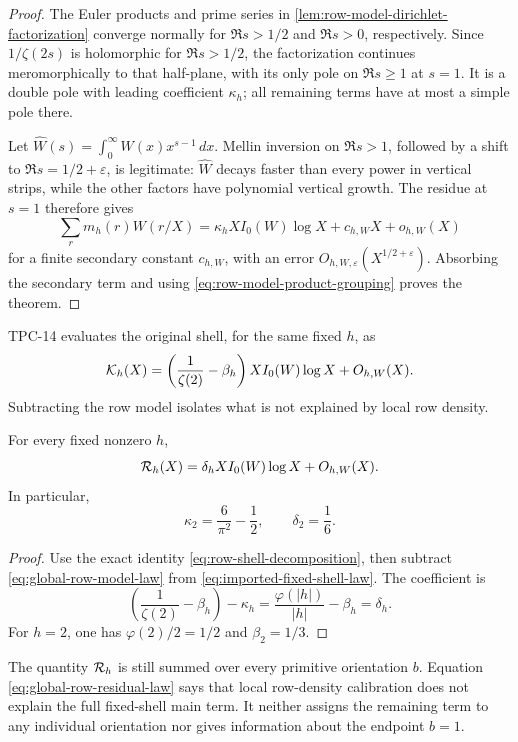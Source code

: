 \begin{proof}
The Euler products and prime series in
\cref{lem:row-model-dirichlet-factorization} converge normally for
$\Re s>1/2$ and $\Re s>0$, respectively.  Since $1/\zeta(2s)$ is
holomorphic for $\Re s>1/2$, the factorization continues meromorphically
to that half-plane, with its only pole on $\Re s\geq1$ at $s=1$.  It is a
double pole with leading coefficient $\kappa_h$; all remaining terms have
at most a simple pole there.

Let $\widehat W(s)=\int_0^\infty W(x)x^{s-1}\,dx$.  Mellin inversion on
$\Re s>1$, followed by a shift to $\Re s=1/2+\varepsilon$, is legitimate:
$\widehat W$ decays faster than every power in vertical strips, while the
other factors have polynomial vertical growth.  The residue at $s=1$
therefore gives
\[
 \sum_rm_h(r)W(r/X)
 =\kappa_hXI_0(W)\log X+c_{h,W}X+o_{h,W}(X)
\]
 for a finite secondary constant $c_{h,W}$, with an error
$O_{h,W,\varepsilon}(X^{1/2+\varepsilon})$.  Absorbing the secondary term
and using \eqref{eq:row-model-product-grouping} proves the theorem.
\end{proof}

TPC-14 \citep{WangTPC14} evaluates the original shell, for the same fixed
$h$, as
\begin{equation}
 \mathcal K_h(X)
 =\left(\frac1{\zeta(2)}-\beta_h\right)
 XI_0(W)\log X+O_{h,W}(X).
 \label{eq:imported-fixed-shell-law}
\end{equation}
Subtracting the row model isolates what is not explained by local row
density.

\begin{corollary}
\label{cor:global-row-residual-law}
For every fixed nonzero $h$,
\begin{equation}
 \mathcal R_h(X)
 =\delta_hXI_0(W)\log X+O_{h,W}(X).
 \label{eq:global-row-residual-law}
\end{equation}
In particular,
\begin{equation}
 \kappa_2=\frac6{\pi^2}-\frac12,
 \qquad
 \delta_2=\frac16.
 \label{eq:h-two-kappa-delta}
\end{equation}
\end{corollary}

\begin{proof}
Use the exact identity \eqref{eq:row-shell-decomposition}, then subtract
\eqref{eq:global-row-model-law} from
\eqref{eq:imported-fixed-shell-law}.  The coefficient is
\[
 \left(\frac1{\zeta(2)}-\beta_h\right)-\kappa_h
 =\frac{\varphi(|h|)}{|h|}-\beta_h=\delta_h.
\]
For $h=2$, one has $\varphi(2)/2=1/2$ and $\beta_2=1/3$.
\end{proof}

\begin{remark}
\label{rem:global-row-residual-interpretation}
The quantity $\mathcal R_h$ is still summed over every primitive orientation
$b$.  Equation \eqref{eq:global-row-residual-law} says that local
row-density calibration does not explain the full fixed-shell main term.
It neither assigns the remaining term to any individual orientation nor
gives information about the endpoint $b=1$.
\end{remark}
